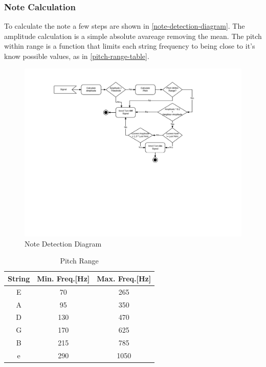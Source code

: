 \subsubsection{Note Calculation}
To calculate the note a few steps are shown in \autoref{note-detection-diagram}.
The amplitude calculation is a simple absolute avareage removing the mean. The
pitch within range is a function that limits each string frequency to
being close to it's know possible values, as in \autoref{pitch-range-table}.
\begin{figure}[htb]
	\caption{Note Detection Diagram}
	\label{note-detection-diagram}
	\begin{center}
		\includegraphics[width=0.7\paperwidth]{images/note-detection-flow-diagram}
	\end{center}
\end{figure}

\begin{table}[htb]
  \ABNTEXreducedfont
  \caption[Pitch Range]{Pitch Range}
  \label{pitch-range-table}
  \centering
  \begin{tabular}{c|c|c}
    \textbf{String} & \textbf{Min. Freq.[Hz]} & \textbf{Max. Freq.[Hz]} \\
		\hline \hline
		E & 70 & 265 \\
		\hline
		A & 95 & 350 \\
		\hline
		D & 130 & 470 \\
		\hline
		G & 170 & 625 \\
		\hline
		B & 215 & 785 \\
		\hline
		e & 290 & 1050 \\
  \end{tabular}
\end{table}

